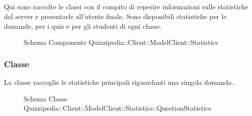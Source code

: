 \subsection{}
Qui sono raccolte le classi con il compito di reperire informazioni sulle statistiche dal server e presentarle all'utente finale. Sono disponibili statistiche per le domande, per i quiz e per gli studenti di ogni classe.
\begin{figure}[H]
\centering
\noindent{}
\caption[Schema Componente Quizzipedia::Client::ModelClient::Statistics]{Schema Componente Quizzipedia::Client::ModelClient::Statistics}
\end{figure}
\subsubsection{Classe }
La classe raccoglie le statistiche principali riguardanti una singola domanda..
\begin{figure}[H]
\centering
\noindent{}
\caption[Schema Classe QuestionStatistics]{Schema Classe Quizzipedia::Client::ModelClient::Statistics::QuestionStatistics}
\end{figure}
